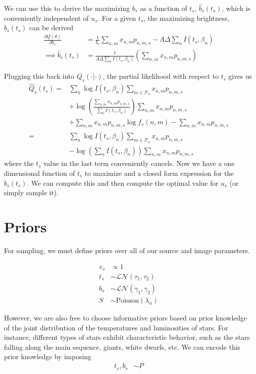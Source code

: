 \documentclass[11pt]{article}
\newcommand{\trans}{\intercal}
\begin{document}
\begin{itemize}
We can use this to derive the maximizing $b_s$ as a function of $t_s$, $\hat b_s(t_s)$, which is conveniently independent of $u_s$.  For a given $t_s$, the maximizing brightness, $\hat b_s(t_s)$ can be derived
\begin{align}
  \frac{\partial Q(\theta)}{\partial b_s} 
    &= \frac{1}{b_s} \sum_{n,m} x_{n,m} p_{n,m,s} - A \Delta \sum_{n} I(t_s, \beta_n) \\
  \implies 
  \hat b_s(t_s) &= \frac{1}{A \Delta \sum_n I(t_s, \beta_n)} \left( \sum_{n,m} x_{n,m} p_{n,m,s} \right)  
\end{align}

Plugging this back into $Q_s(\cdot | \cdot)$, the partial likelihood with respect to $t_s$ gives us 
\begin{align}
  \hat Q_s(t_s) 
    =& \sum_{n} \log I(t_s, \beta_n) \sum_{m \in \mathcal{P}_n} x_{n,m} p_{n,m,s} \\
    & + \log\left( \frac{ \sum_{n,m} x_{n,m} p_{n,m,s} }{\sum_{n} I(t_s, \beta_n)} \right) \sum_{n,m} x_{n,m} p_{n,m,s} \\
    & + \sum_{n,m} x_{n,m} p_{n,m,s} \log f_s(n,m) - \sum_{n,m} x_{n,m} p_{n,m,s} \\
    =& \sum_{n} \log I(t_s, \beta_n) \sum_{m\in \mathcal{P}_n} x_{n,m} p_{n,m,s} \\
    & - \log\left( \sum_{n} I(t_s, \beta_n) \right) \sum_{n,m} x_{n,m} p_{n,m,s}
\end{align}
where the $t_s$ value in the last term conveniently cancels.  Now we have a one dimensional function of $t_s$ to maximize and a closed form expression for the $\hat b_s(t_s)$.  We can compute this and then compute the optimal value for $u_s$ (or simply sample it).  

\end{itemize}

\section{Priors}
For sampling, we must define priors over all of our source and image parameters.  

\begin{align}
  v_s &\propto 1 \\
  t_s &\sim \mathcal{LN}(\tau_1, \tau_2) \\
  b_s &\sim \mathcal{LN}(\gamma_1, \gamma_2) \\
  S   &\sim \textrm{Poisson}(\lambda_n) 
\end{align}


However, we are also free to choose informative priors based on prior knowledge of the joint distribution of the temperatures and luminosities of stars.  For instance, different types of stars exhibit characteristic behavior, such as the stars falling along the main sequence, giants, white dwarfs, etc.  We can encode this prior knowledge by imposing 
\begin{align}
  t_s, b_s &\sim P
\end{align}
\end{document}
